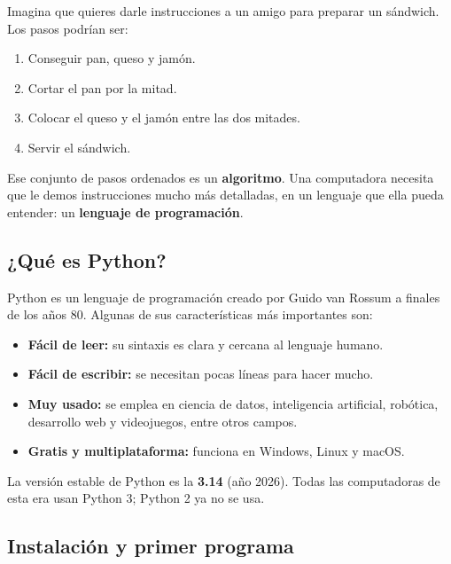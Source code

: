 \documentclass[11pt,a4paper]{article}
\begin{document}
\begin{cajaEjemplo}
Imagina que quieres darle instrucciones a un amigo para preparar un sándwich. Los pasos podrían ser:

\begin{enumerate}
    \item Conseguir pan, queso y jamón.
    \item Cortar el pan por la mitad.
    \item Colocar el queso y el jamón entre las dos mitades.
    \item Servir el sándwich.
\end{enumerate}

Ese conjunto de pasos ordenados es un \textbf{algoritmo}. Una computadora necesita que le demos instrucciones mucho más detalladas, en un lenguaje que ella pueda entender: un \textbf{lenguaje de programación}.
\end{cajaEjemplo}

\subsection{¿Qué es Python?}

Python es un lenguaje de programación creado por Guido van Rossum a finales de los años 80. Algunas de sus características más importantes son:

\begin{itemize}
    \item \textbf{Fácil de leer:} su sintaxis es clara y cercana al lenguaje humano.
    \item \textbf{Fácil de escribir:} se necesitan pocas líneas para hacer mucho.
    \item \textbf{Muy usado:} se emplea en ciencia de datos, inteligencia artificial, robótica, desarrollo web y videojuegos, entre otros campos.
    \item \textbf{Gratis y multiplataforma:} funciona en Windows, Linux y macOS.
\end{itemize}

\begin{cajaRecuerda}
La versión estable de Python es la \textbf{3.14} (año 2026). Todas las computadoras de esta era usan Python 3; Python 2 ya no se usa.
\end{cajaRecuerda}

\subsection{Instalación y primer programa}
\end{document}

